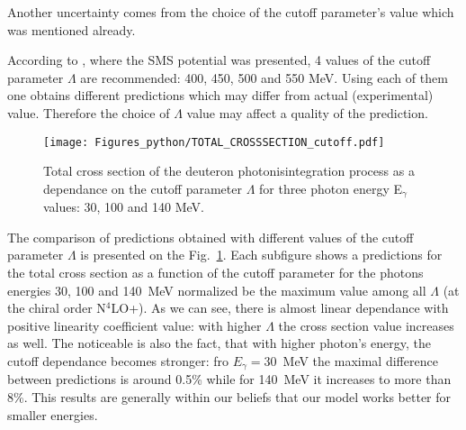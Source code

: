     Another uncertainty comes from the choice of the cutoff parameter's value 
    which was mentioned already.

   According to \cite{reinkrebs2018}, where the SMS potential was presented,
   4 values of the cutoff parameter $\Lambda$ are recommended: 400, 450, 500 and 550 MeV.
   Using each of them one obtains different predictions which may differ 
   from actual (experimental) value. Therefore the choice of $\Lambda$ value
   may affect a quality of the prediction.


   \begin{figure}[h]
    \begin{center}
        \texttt{[image: Figures\_python/TOTAL\_CROSSSECTION\_cutoff.pdf]}
    \end{center}
    \caption{Total cross section of the deuteron photonisintegration
    process as a dependance on the cutoff parameter $\Lambda$ 
    for three photon energy E$_\gamma$ values: 30, 100 and 140 MeV.}
    \label{Cutoff_dep}
    \end{figure}

    The comparison of predictions obtained with different values of the 
    cutoff parameter $\Lambda$ is presented on the Fig.~\ref{Cutoff_dep}.
    Each subfigure shows a predictions for the total cross section as 
    a function of the cutoff parameter for the photons energies 30, 100 and 140~MeV
    normalized be the maximum value among all $\Lambda$ 
    (at the chiral order N$^4$LO+).
    As we can see,
    there is almost linear dependance with positive linearity coefficient value:
    with higher $\Lambda$ the cross section value increases as well.
    The noticeable is also the fact, that with higher photon's energy,
    the cutoff dependance becomes stronger: fro $E_\gamma=30$~MeV
    the maximal difference between predictions is around 0.5\% while
    for 140~MeV it increases to more than 8\%. This results are
    generally within our beliefs that our model works better for
    smaller energies. 























